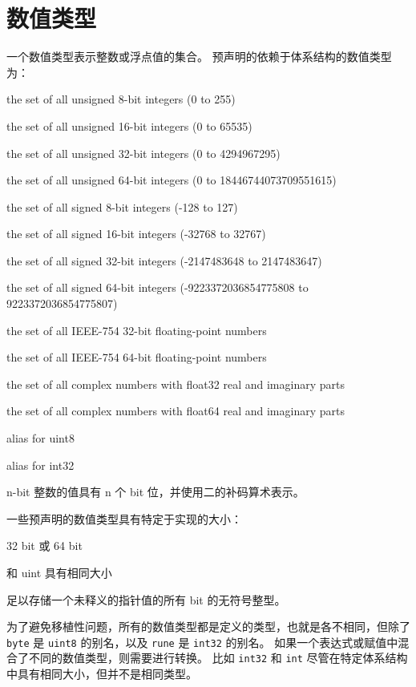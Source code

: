 \section{数值类型}
一个数值类型表示整数或浮点值的集合。
预声明的依赖于体系结构的数值类型为：
\begin{description}[leftmargin=4\parindent,style=sameline] %
\item[uint8]	   the set of all unsigned  8-bit integers (0 to 255)
\item[uint16]      the set of all unsigned 16-bit integers (0 to 65535)
\item[uint32]      the set of all unsigned 32-bit integers (0 to 4294967295)
\item[uint64]      the set of all unsigned 64-bit integers (0 to 18446744073709551615)
\item[int8]        the set of all signed  8-bit integers (-128 to 127)
\item[int16]       the set of all signed 16-bit integers (-32768 to 32767)
\item[int32]       the set of all signed 32-bit integers (-2147483648 to 2147483647)
\item[int64]       the set of all signed 64-bit integers (-9223372036854775808 to \\ 9223372036854775807)
\item[float32]     the set of all IEEE-754 32-bit floating-point numbers
\item[float64]     the set of all IEEE-754 64-bit floating-point numbers

\item[complex64]   the set of all complex numbers with float32 real and imaginary parts
\item[complex128]  the set of all complex numbers with float64 real and imaginary parts

\item[byte]        alias for uint8
\item[rune]        alias for int32
\end{description}
n-bit 整数的值具有 n 个 bit 位，并使用二的补码算术表示。

一些预声明的数值类型具有特定于实现的大小：
\begin{description}[font=\ttfamily\bfseries, style=sameline, leftmargin=4\parindent, labelindent=\parindent]
\item[uint] 32 bit 或 64 bit
\item[int] 和 uint 具有相同大小
\item[uintptr] 足以存储一个未释义的指针值的所有 bit 的无符号整型。
\end{description}
为了避免移植性问题，所有的数值类型都是定义的类型，也就是各不相同，但除了 \lstinline|byte| 是 \lstinline|uint8| 的别名，以及 \lstinline|rune| 是 \lstinline|int32| 的别名。
如果一个表达式或赋值中混合了不同的数值类型，则需要进行转换。
比如 \lstinline|int32| 和 \lstinline|int| 尽管在特定体系结构中具有相同大小，但并不是相同类型。

